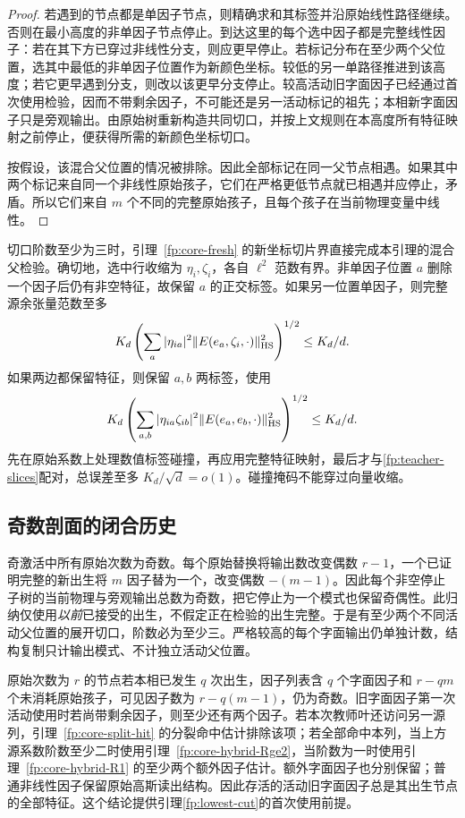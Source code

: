 \documentclass[a4paper]{tufte-handout}
\begin{document}
\begin{fullwidth}
\begin{proof}
若遇到的节点都是单因子节点，则精确求和其标签并沿原始线性路径继续。否则在最小高度的非单因子节点停止。到达这里的每个选中因子都是完整线性因子：若在其下方已穿过非线性分支，则应更早停止。若标记分布在至少两个父位置，选其中最低的非单因子位置作为新颜色坐标。较低的另一单路径推进到该高度；若它更早遇到分支，则改以该更早分支停止。较高活动旧字面因子已经通过首次使用检验，因而不带剩余因子，不可能还是另一活动标记的祖先；本相新字面因子只是旁观输出。由原始树重新构造共同切口，并按上文规则在本高度所有特征映射之前停止，便获得所需的新颜色坐标切口。

按假设，该混合父位置的情况被排除。因此全部标记在同一父节点相遇。如果其中两个标记来自同一个非线性原始孩子，它们在严格更低节点就已相遇并应停止，矛盾。所以它们来自 $m$ 个不同的完整原始孩子，且每个孩子在当前物理变量中线性。
\end{proof}

切口阶数至少为三时，引理~\ref{fp:core-fresh} 的新坐标切片界直接完成本引理的混合父检验。确切地，选中行收缩为 $\eta_i,\zeta_i$，各自 $\ell^2$ 范数有界。非单因子位置 $a$ 删除一个因子后仍有非空特征，故保留 $a$ 的正交标签。如果另一位置单因子，则完整源余张量范数至多
\begin{equation}\label{fp:two-mark-vector}
 K_d\left(\sum_a|\eta_{ia}|^2
       \|E(e_a,\zeta_i,\cdot)\|_{\rm HS}^2\right)^{1/2}
 \le K_d/d.
\end{equation}
如果两边都保留特征，则保留 $a,b$ 两标签，使用
\begin{equation}\label{fp:two-mark-coordinate}
 K_d\left(\sum_{a,b}|\eta_{ia}\zeta_{ib}|^2
       \|E(e_a,e_b,\cdot)\|_{\rm HS}^2\right)^{1/2}
 \le K_d/d.
\end{equation}
先在原始系数上处理数值标签碰撞，再应用完整特征映射，最后才与\eqref{fp:teacher-slices}配对，总误差至多 $K_d/\sqrt d=o(1)$。碰撞掩码不能穿过向量收缩。

\subsection{奇数剖面的闭合历史}
奇激活中所有原始次数为奇数。每个原始替换将输出数改变偶数 $r-1$，一个已证明完整的新出生将 $m$ 因子替为一个，改变偶数 $-(m-1)$。因此每个非空停止子树的当前物理与旁观输出总数为奇数，把它停止为一个模式也保留奇偶性。此归纳仅使用\emph{以前}已接受的出生，不假定正在检验的出生完整。于是有至少两个不同活动父位置的展开切口，阶数必为至少三。严格较高的每个字面输出仍单独计数，结构复制只计输出模式、不计独立活动父位置。

原始次数为 $r$ 的节点若本相已发生 $q$ 次出生，因子列表含 $q$ 个字面因子和 $r-qm$ 个未消耗原始孩子，可见因子数为 $r-q(m-1)$，仍为奇数。旧字面因子第一次活动使用时若尚带剩余因子，则至少还有两个因子。若本次教师叶还访问另一源列，引理~\ref{fp:core-split-hit} 的分裂命中估计排除该项；若全部命中本列，当上方源系数阶数至少二时使用引理~\ref{fp:core-hybrid-Rge2}，当阶数为一时使用引理~\ref{fp:core-hybrid-R1} 的至少两个额外因子估计。额外字面因子也分别保留；普通非线性因子保留原始高斯读出结构。因此存活的活动旧字面因子总是其出生节点的全部特征。这个结论提供引理\ref{fp:lowest-cut}的首次使用前提。


\end{fullwidth}
\end{document}
